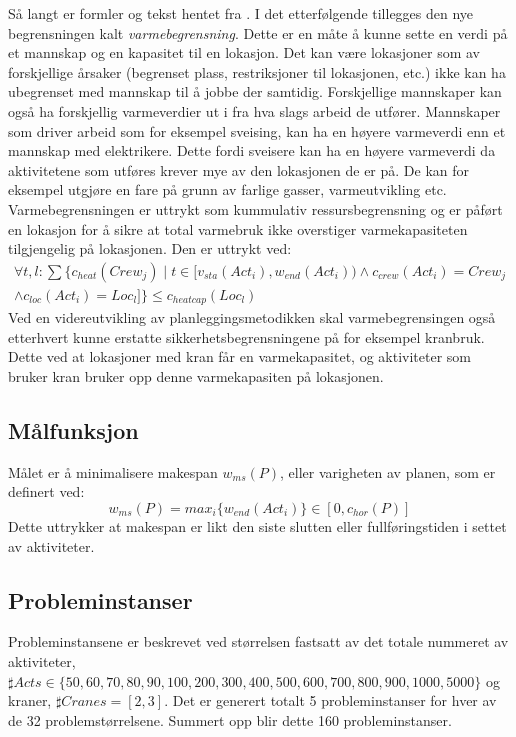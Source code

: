 Så langt er formler og tekst hentet fra \cite{tvedtbezem}. I det etterfølgende tillegges den nye begrensningen kalt \textit{varmebegrensning}. Dette er en måte å kunne sette en verdi på et mannskap og en kapasitet til en lokasjon. Det kan være lokasjoner som av forskjellige årsaker (begrenset plass, restriksjoner til lokasjonen, etc.) ikke kan ha ubegrenset med mannskap til å jobbe der samtidig. Forskjellige mannskaper kan også ha forskjellig varmeverdier ut i fra hva slags arbeid de utfører. Mannskaper som driver arbeid som for eksempel sveising, kan ha en høyere varmeverdi enn et mannskap med elektrikere. Dette fordi sveisere kan ha en høyere varmeverdi da aktivitetene som utføres krever mye av den lokasjonen de er på. De kan for eksempel utgjøre en fare på grunn av farlige gasser, varmeutvikling etc. Varmebegrensningen er uttrykt som kummulativ ressursbegrensning og er påført en lokasjon for å sikre at total varmebruk ikke overstiger varmekapasiteten tilgjengelig på lokasjonen. Den er uttrykt ved:
\begin{equation}
\begin{split}
\forall t,l: \sum\{c_{heat}(Crew_j) \mid t \in [ v_{sta}(Act_{i}), w_{end}(Act_{i})) \wedge c_{crew}(Act_{i}) = Crew_{j} \\
\wedge c_{loc}(Act_{i}) = Loc_{l} ] \} \le c_{heatcap}(Loc_{l})
\end{split}
\end{equation}
Ved en videreutvikling av planleggingsmetodikken skal varmebegrensingen også etterhvert kunne erstatte sikkerhetsbegrensningene på for eksempel kranbruk. Dette ved at lokasjoner med kran får en varmekapasitet, og aktiviteter som bruker kran bruker opp denne varmekapasiten på lokasjonen.

\subsection{Målfunksjon}
\label{sec:makespandef}
Målet er å minimalisere makespan $ w_{ms}(P) $, eller varigheten av planen, som er definert ved:
\begin{equation}
w_{ms}(P) = max_{i} \{ w_{end}(Act_{i}) \} \in [0,c_{hor}(P)]
\end{equation}
Dette uttrykker at makespan er likt den siste slutten eller fullføringstiden i settet av aktiviteter.

\subsection{Probleminstanser}
Probleminstansene er beskrevet ved størrelsen fastsatt av det totale nummeret av aktiviteter, $ \sharp Acts \in \{ 50,60, 70, 80, 90, 100, 200, 300, 400, 500, 600, 700, 800, 900, 1000, 5000 \} $ og kraner, $ \sharp Cranes = [2,3] $. Det er generert totalt 5 probleminstanser for hver av de 32 problemstørrelsene. Summert opp blir dette 160 probleminstanser.

